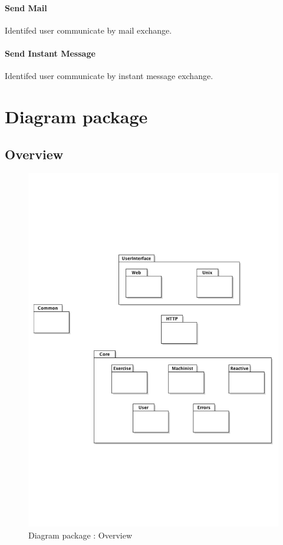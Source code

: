 		\subsubsection{Send Mail}
			Identifed user communicate by mail exchange.
		\subsubsection{Send Instant Message}
			Identifed user communicate by instant message exchange.

\chapter{Diagram package}

\section{Overview}
	\begin{figure}[ht]
			\begin{center}
				\includegraphics[width=\textwidth,  trim=2cm 6cm 2cm 7cm]{UML_figure/DP/general/DP_General.pdf}
				\caption{Diagram package : Overview}
			\end{center}
	\end{figure}
